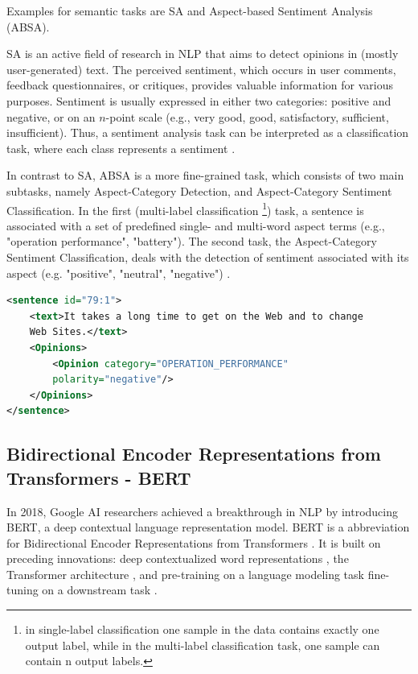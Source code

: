 Examples for semantic tasks are SA and Aspect-based Sentiment Analysis (ABSA). 

SA is an active field of research in NLP that aims to detect opinions in (mostly user-generated) text. The perceived sentiment, which occurs in user comments, feedback questionnaires, or critiques, provides valuable information for various purposes. Sentiment is usually expressed in either two categories: positive and negative, or on an $n$-point scale (e.g., very good, good, satisfactory, sufficient, insufficient). Thus, a sentiment analysis task can be interpreted as a classification task, where each class represents a sentiment \cite{prabowo2009sentiment}.

In contrast to SA, ABSA is a more fine-grained task, which consists of two main subtasks, namely Aspect-Category Detection, and Aspect-Category Sentiment Classification. In the first (multi-label classification \footnote{in single-label classification one sample in the data contains exactly one output label, while in the multi-label classification task, one sample can contain n output labels.}) task, a sentence is associated with a set of predefined single- and multi-word aspect terms (e.g., "operation performance", "battery"). The second task, the Aspect-Category Sentiment Classification, deals with the detection of sentiment associated with its aspect (e.g. "positive", "neutral", "negative") \cite{pavlopoulos2014aspect}.


\begin{lstlisting}[language=xml]
<sentence id="79:1">
    <text>It takes a long time to get on the Web and to change
    Web Sites.</text>
    <Opinions>
        <Opinion category="OPERATION_PERFORMANCE" 
        polarity="negative"/>
    </Opinions>
</sentence>

\end{lstlisting}



\subsection{Bidirectional Encoder Representations from Transformers - BERT}
    \label{sec:bert}
In 2018, Google AI researchers achieved a breakthrough in NLP by introducing BERT, a deep contextual language representation model. BERT is a abbreviation for Bidirectional Encoder Representations from Transformers \cite{devlin2018bert}. It is built on preceding innovations: deep contextualized word representations \cite{peters2018deep}, the Transformer architecture \cite{vaswani2017attention}, and pre-training on a language modeling task fine-tuning on a downstream task \cite{radford2018improving, howard2018universal}.

